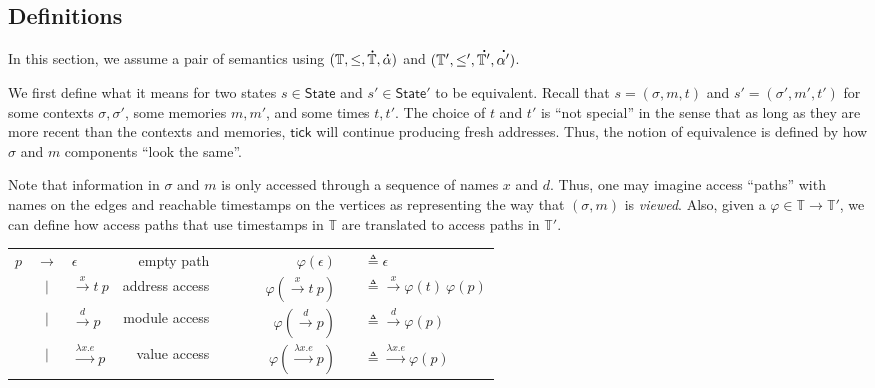 \documentclass[acmsmall,screen,review]{acmart}\settopmatter{printfolios=true,printccs=false,printacmref=false}
\newcommand*{\A}[1]{\overset{\,_{\mbox{\Large .}}}{#1}}
\newcommand*{\modid}{d}
\newcommand*{\Time}{\mathbb{T}}
\newcommand*{\ATime}{\A{\Time}}
\newcommand*{\ctx}{\sigma}
\newcommand*{\mem}{m}
\newcommand*{\State}{\mathsf{State}}
\newcommand*{\tick}{\mathsf{tick}}
\begin{document}
\subsection{Definitions}
In this section, we assume a pair of semantics using $(\Time,\le,\ATime,\A\alpha)$ and $(\Time',\le',\A{\Time'},\A{\alpha'})$.

We first define what it means for two states $s\in\State$ and $s'\in\State'$ to be equivalent.
Recall that $s=(\ctx,\mem,t)$ and $s'=(\ctx',\mem',t')$ for some contexts $\ctx,\ctx'$, some memories $\mem,\mem'$, and some times $t,t'$.
The choice of $t$ and $t'$ is ``not special'' in the sense that as long as they are more recent than the contexts and memories, $\tick$ will continue producing fresh addresses.
Thus, the notion of equivalence is defined by how $\ctx$ and $\mem$ components ``look the same''.

Note that information in $\ctx$ and $\mem$ is only accessed through a sequence of names $x$ and $\modid$.
Thus, one may imagine access ``paths'' with names on the edges and reachable timestamps on the vertices as representing the way that $(\ctx,\mem)$ is \emph{viewed}.
Also, given a $\varphi\in\Time\rightarrow\Time'$, we can define how access paths that use timestamps in $\Time$ are translated to access paths in $\Time'$.
\begin{center}
  \begin{tabular}{rclrcrcl}
    $p$ & $\rightarrow$ & $\epsilon$                   & empty path     & $\qquad$ & $\varphi(\epsilon)$                   & \hspace{-2em} & $\triangleq\epsilon$                              \\
        & $|$           & $\xrightarrow{x}t\:p$        & address access & $\qquad$ & $\varphi(\xrightarrow{x}t\:p)$        & \hspace{-2em} & $\triangleq\xrightarrow{x}\varphi(t)\:\varphi(p)$ \\
        & $|$           & $\xrightarrow{\modid}p$      & module access  & $\qquad$ & $\varphi(\xrightarrow{\modid}p)$      & \hspace{-2em} & $\triangleq\xrightarrow{\modid}\varphi(p)$        \\
        & $|$           & $\xrightarrow{\lambda x.e}p$ & value access   & $\qquad$ & $\varphi(\xrightarrow{\lambda x.e}p)$ & \hspace{-2em} & $\triangleq\xrightarrow{\lambda x.e}\varphi(p)$
  \end{tabular}
\end{center}
\end{document}
